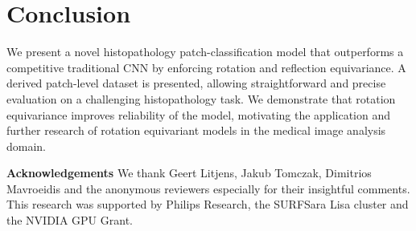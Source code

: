 \documentclass{llncs}
\begin{document}
    



    



    
    




    

\section{Conclusion}
We present a novel histopathology patch-classification model that outperforms a competitive traditional CNN by enforcing rotation and reflection equivariance. A derived patch-level dataset is presented, allowing straightforward and precise evaluation on a challenging histopathology task. We demonstrate that rotation equivariance improves reliability of the model, motivating the application and further research of rotation equivariant models in the medical image analysis domain.
\par\textbf{Acknowledgements}
We thank Geert Litjens, Jakub Tomczak, Dimitrios Mavroeidis and the anonymous reviewers especially for their insightful comments. This research was supported by Philips Research, the SURFSara Lisa cluster and the NVIDIA GPU Grant.














\end{document}
